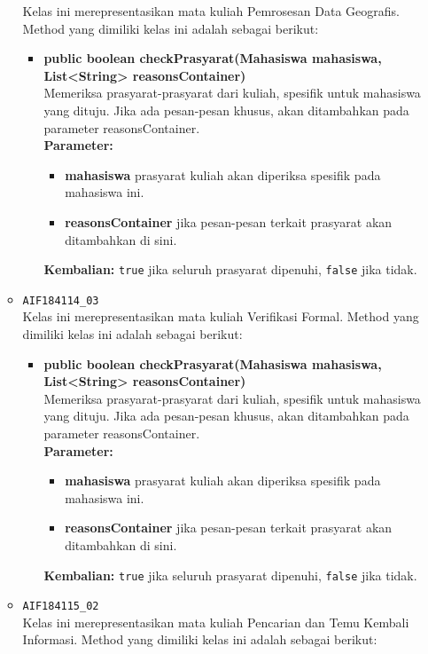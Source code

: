 \begin{enumerate}
\begin{itemize}
		Kelas ini merepresentasikan mata kuliah Pemrosesan Data Geografis. Method yang dimiliki kelas ini adalah sebagai berikut: 
		\begin{itemize}
			\item \textbf{public boolean checkPrasyarat(Mahasiswa mahasiswa, List<String> reasonsContainer)}\\
			Memeriksa prasyarat-prasyarat dari kuliah, spesifik untuk mahasiswa yang dituju. Jika ada pesan-pesan khusus, akan ditambahkan pada parameter reasonsContainer.\\
			\textbf{Parameter:}
			\begin{itemize}
				\item \textbf{mahasiswa} prasyarat kuliah akan diperiksa spesifik pada mahasiswa ini.
				\item \textbf{reasonsContainer} jika pesan-pesan terkait prasyarat akan ditambahkan di sini.
			\end{itemize}
			\textbf{Kembalian:} \texttt{true} jika seluruh prasyarat dipenuhi, \texttt{false} jika tidak.
		\end{itemize}
		\item \texttt{AIF184114\_03} \\
		Kelas ini merepresentasikan mata kuliah Verifikasi Formal. Method yang dimiliki kelas ini adalah sebagai berikut: 
		\begin{itemize}
			\item \textbf{public boolean checkPrasyarat(Mahasiswa mahasiswa, List<String> reasonsContainer)}\\
			Memeriksa prasyarat-prasyarat dari kuliah, spesifik untuk mahasiswa yang dituju. Jika ada pesan-pesan khusus, akan ditambahkan pada parameter reasonsContainer.\\
			\textbf{Parameter:}
			\begin{itemize}
				\item \textbf{mahasiswa} prasyarat kuliah akan diperiksa spesifik pada mahasiswa ini.
				\item \textbf{reasonsContainer} jika pesan-pesan terkait prasyarat akan ditambahkan di sini.
			\end{itemize}
			\textbf{Kembalian:} \texttt{true} jika seluruh prasyarat dipenuhi, \texttt{false} jika tidak.
		\end{itemize}
		\item \texttt{AIF184115\_02} \\
		Kelas ini merepresentasikan mata kuliah Pencarian dan Temu Kembali Informasi. Method yang dimiliki kelas ini adalah sebagai berikut: 

\end{itemize}
\end{enumerate}
